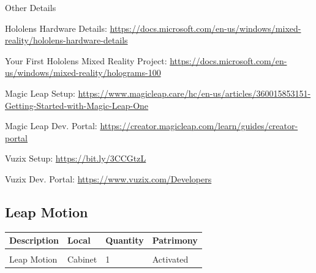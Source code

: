 {\Large Other Details}
\vspace{1em}

Hololens Hardware Details: \url{https://docs.microsoft.com/en-us/windows/mixed-reality/hololens-hardware-details}

Your First Hololens Mixed Reality Project: \url{https://docs.microsoft.com/en-us/windows/mixed-reality/holograms-100}

\vspace{1em}

Magic Leap Setup: \url{https://www.magicleap.care/hc/en-us/articles/360015853151-Getting-Started-with-Magic-Leap-One}

Magic Leap Dev. Portal: \url{https://creator.magicleap.com/learn/guides/creator-portal}

\vspace{1em}

Vuzix Setup: \url{https://bit.ly/3CCGtzL}

Vuzix Dev. Portal: \url{https://www.vuzix.com/Developers}

\newpage

\subsection{Leap Motion}
\begin{tabularx}{\textwidth}{ Y  Y  Y  Y }
    \textbf{Description} &  \textbf{Local} &  \textbf{Quantity} & \textbf{Patrimony}\\
    \hline \\
     Leap Motion & Cabinet & 1 & Activated
\end{tabularx}
\vspace{1cm}

